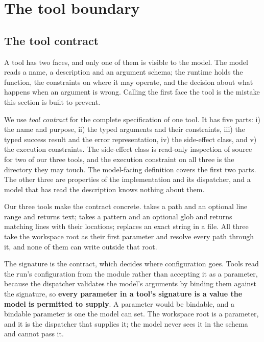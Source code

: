 \section{The tool boundary}
\label{sec:boundary}

\subsection{The tool contract}
\label{sec:boundary-contract}

A tool has two faces, and only one of them is visible to the model. The model reads a name, a
description and an argument schema; the runtime holds the function, the constraints on where it may
operate, and the decision about what happens when an argument is wrong. Calling the first face the
tool is the mistake this section is built to prevent.

\begin{definition}
\label{def:tool-contract}
We use \emph{tool contract} for the complete specification of one tool. It has five parts: i) the
name and purpose, ii) the typed arguments and their constraints, iii) the typed success result and
the error representation, iv) the side-effect class, and v) the execution constraints. The
side-effect class is read-only inspection of source for two of our three tools, and the execution
constraint on all three is the directory they may touch. The model-facing definition covers the
first two parts. The other three are properties of the implementation and its dispatcher, and a
model that has read the description knows nothing about them.
\end{definition}

Our three tools make the contract concrete.  takes a path and an optional line
range and returns text;  takes a pattern and an optional glob and returns matching
lines with their locations;  replaces an exact string in a file. All three take the
workspace root as their first parameter and resolve every path through it, and none of them can
write outside that root.

The signature is the contract, which decides where configuration goes. Tools read the run's
configuration from the module rather than accepting it as a parameter, because the dispatcher
validates the model's arguments by binding them against the signature, so \textbf{every parameter
in a tool's signature is a value the model is permitted to supply}. A  parameter
would be bindable, and a bindable parameter is one the model can set. The workspace root is a
parameter, and it is the dispatcher that supplies it; the model never sees it in the schema and
cannot pass it.

